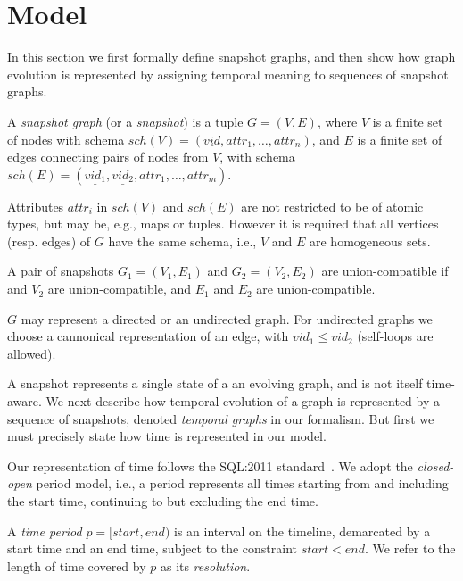 \section{Model}
\label{sec:model}

In this section we first formally define snapshot graphs, and then
show how graph evolution is represented by assigning temporal meaning
to sequences of snapshot graphs.

\begin{definition}
\label{def:sg}
A {\em snapshot graph} (or a {\em snapshot}) is a tuple $G = (V,E)$,
where $V$ is a finite set of nodes with schema
$sch(V)=(\underline{vid}, attr_1, \ldots, attr_n)$, and $E$ is a
finite set of edges connecting pairs of nodes from $V$, with schema
$sch(E)=(\underline{vid_1}, \underline{vid_2}, attr_1, \ldots,
attr_m)$.
\end{definition}

Attributes $attr_i$ in $sch(V)$ and $sch(E)$ are not restricted to be
of atomic types, but may be, e.g., maps or tuples. However it is
required that all vertices (resp. edges) of $G$ have the same schema,
i.e., $V$ and $E$ are homogeneous sets.  

A pair of snapshots $G_1 = (V_1, E_1)$ and $G_2 = (V_2, E_2)$ are
union-compatible if and $V_2$ are union-compatible, and $E_1$ and
$E_2$ are union-compatible.

$G$ may represent a directed or an undirected graph.  For undirected
graphs we choose a cannonical representation of an edge, with $vid_1
\leq vid_2$ (self-loops are allowed).

A snapshot represents a single state of a an evolving graph, and is
not itself time-aware.  We next describe how temporal evolution of a
graph is represented by a sequence of snapshots, denoted {\em temporal
  graphs} in our formalism.  But first we must precisely state how
time is represented in our model.

Our representation of time follows the SQL:2011
standard~\cite{DBLP:journals/sigmod/KulkarniM12}.  We adopt the {\em
  closed-open} period model, i.e., a period represents all times
starting from and including the start time, continuing to but
excluding the end time.

\begin{definition}
\label{def:period}
A {\em time period} $p = [start, end)$ is an interval on the timeline,
  demarcated by a start time and an end time, subject to the
  constraint $start < end$.  We refer to the length of time covered by
  $p$ as its {\em resolution}.
\end{definition}

